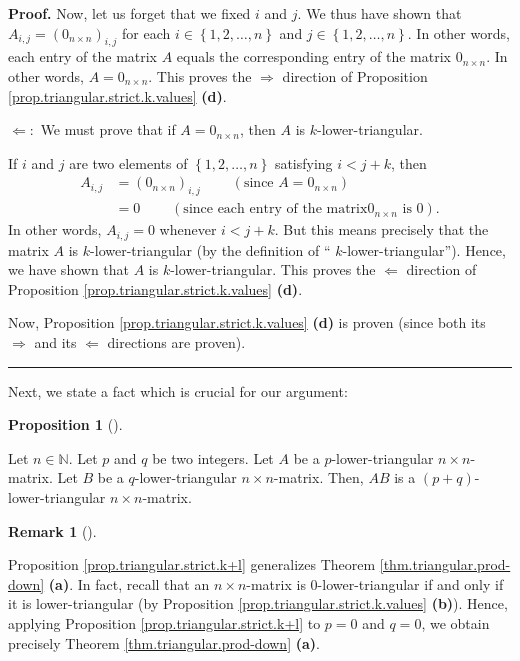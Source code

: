 \documentclass[numbers=enddot,12pt,final,onecolumn,notitlepage]{scrartcl}%
\theoremstyle{definition}
\newtheorem{prop}[theo]{Proposition}
\newenvironment{proposition}[1][]
{\begin{prop}[#1]\begin{leftbar}}
{\end{leftbar}\end{prop}}
\newtheorem{remk}[theo]{Remark}
\newenvironment{remark}[1][]
{\begin{remk}[#1]\begin{leftbar}}
{\end{leftbar}\end{remk}}
\newenvironment{proof}[1][Proof]{\noindent\textbf{#1.} }{\ \rule{0.5em}{0.5em}}
\begin{document}
\begin{proof}
Now, let us forget that we fixed $i$ and $j$. We thus have shown that
$A_{i,j}=\left(  0_{n\times n}\right)  _{i,j}$ for each $i\in\left\{
1,2,\ldots,n\right\}  $ and $j\in\left\{  1,2,\ldots,n\right\}  $. In other
words, each entry of the matrix $A$ equals the corresponding entry of the
matrix $0_{n\times n}$. In other words, $A=0_{n\times n}$. This proves the
$\Longrightarrow$ direction of Proposition
\ref{prop.triangular.strict.k.values} \textbf{(d)}.

$\Longleftarrow:$ We must prove that if $A=0_{n\times n}$, then $A$ is $k$-lower-triangular.

If $i$ and $j$ are two elements of $\left\{  1,2,\ldots,n\right\}  $
satisfying $i<j+k$, then%
\begin{align*}
A_{i,j}  &  =\left(  0_{n\times n}\right)  _{i,j}\ \ \ \ \ \ \ \ \ \ \left(
\text{since }A=0_{n\times n}\right) \\
&  =0\ \ \ \ \ \ \ \ \ \ \left(  \text{since each entry of the matrix
}0_{n\times n}\text{ is }0\right)  .
\end{align*}
In other words, $A_{i,j}=0$ whenever $i<j+k$. But this means precisely that
the matrix $A$ is $k$-lower-triangular (by the definition of \textquotedblleft%
$k$-lower-triangular\textquotedblright). Hence, we have shown that $A$ is
$k$-lower-triangular. This proves the $\Longleftarrow$ direction of
Proposition \ref{prop.triangular.strict.k.values} \textbf{(d)}.

Now, Proposition \ref{prop.triangular.strict.k.values} \textbf{(d)} is proven
(since both its $\Longrightarrow$ and its $\Longleftarrow$ directions are proven).
\end{proof}

Next, we state a fact which is crucial for our argument:

\begin{proposition}
\label{prop.triangular.strict.k+l}Let $n\in\mathbb{N}$. Let $p$ and $q$ be two
integers. Let $A$ be a $p$-lower-triangular $n\times n$-matrix. Let $B$ be a
$q$-lower-triangular $n\times n$-matrix. Then, $AB$ is a $\left(  p+q\right)
$-lower-triangular $n\times n$-matrix.
\end{proposition}

\begin{remark}
Proposition \ref{prop.triangular.strict.k+l} generalizes Theorem
\ref{thm.triangular.prod-down} \textbf{(a)}. In fact, recall that an $n\times
n$-matrix is $0$-lower-triangular if and only if it is lower-triangular (by
Proposition \ref{prop.triangular.strict.k.values} \textbf{(b)}). Hence,
applying Proposition \ref{prop.triangular.strict.k+l} to $p=0$ and $q=0$, we
obtain precisely Theorem \ref{thm.triangular.prod-down} \textbf{(a)}.
\end{remark}
\end{document}
